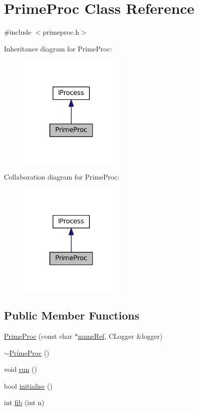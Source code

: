 \hypertarget{classPrimeProc}{}\section{Prime\+Proc Class Reference}
\label{classPrimeProc}


{\ttfamily \#include $<$primeproc.\+h$>$}



Inheritance diagram for Prime\+Proc\+:
\nopagebreak
\begin{figure}[H]
\begin{center}
\leavevmode
\includegraphics[width=145pt]{classPrimeProc__inherit__graph}
\end{center}
\end{figure}


Collaboration diagram for Prime\+Proc\+:
\nopagebreak
\begin{figure}[H]
\begin{center}
\leavevmode
\includegraphics[width=145pt]{classPrimeProc__coll__graph}
\end{center}
\end{figure}
\subsection*{Public Member Functions}
\begin{DoxyCompactItemize}
\item 
\hyperlink{classPrimeProc_a77faab1b7b50b09b6a1dac931183acd6}{Prime\+Proc} (const char $\ast$\hyperlink{classIProcess_ad8e9a2d6537a7671236456af14b3a5b7}{name\+Ref}, C\+Logger \&logger)
\item 
\hyperlink{classPrimeProc_a5765b088769c328c7e1fbbf4af5b0395}{$\sim$\+Prime\+Proc} ()
\item 
void \hyperlink{classPrimeProc_a650b1ea0ed282f5137b594a8f916990a}{run} ()
\item 
bool \hyperlink{classPrimeProc_ac8b98010d54586414e26f84aec7c9067}{initialise} ()
\item 
int \hyperlink{classPrimeProc_ad24fb156156bb16d6018c549c2474dfc}{fib} (int n)
\end{DoxyCompactItemize}
